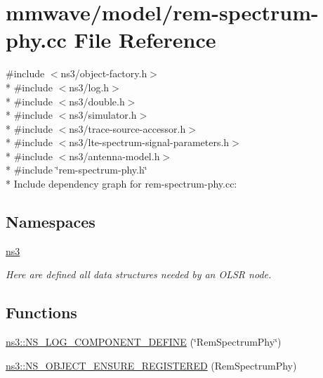 \hypertarget{mmwave_2model_2rem-spectrum-phy_8cc}{}\section{mmwave/model/rem-\/spectrum-\/phy.cc File Reference}
\label{mmwave_2model_2rem-spectrum-phy_8cc}
{\ttfamily \#include $<$ns3/object-\/factory.\+h$>$}\\*
{\ttfamily \#include $<$ns3/log.\+h$>$}\\*
{\ttfamily \#include $<$ns3/double.\+h$>$}\\*
{\ttfamily \#include $<$ns3/simulator.\+h$>$}\\*
{\ttfamily \#include $<$ns3/trace-\/source-\/accessor.\+h$>$}\\*
{\ttfamily \#include $<$ns3/lte-\/spectrum-\/signal-\/parameters.\+h$>$}\\*
{\ttfamily \#include $<$ns3/antenna-\/model.\+h$>$}\\*
{\ttfamily \#include \char`\"{}rem-\/spectrum-\/phy.\+h\char`\"{}}\\*
Include dependency graph for rem-\/spectrum-\/phy.cc\+:
\subsection*{Namespaces}
\begin{DoxyCompactItemize}
\item 
 \hyperlink{namespacens3}{ns3}
\begin{DoxyCompactList}\small\item\em Here are defined all data structures needed by an O\+L\+SR node. \end{DoxyCompactList}\end{DoxyCompactItemize}
\subsection*{Functions}
\begin{DoxyCompactItemize}
\item 
\hyperlink{namespacens3_a25e3dce787023244a4dc9271190670d6}{ns3\+::\+N\+S\+\_\+\+L\+O\+G\+\_\+\+C\+O\+M\+P\+O\+N\+E\+N\+T\+\_\+\+D\+E\+F\+I\+NE} (\char`\"{}Rem\+Spectrum\+Phy\char`\"{})
\item 
\hyperlink{namespacens3_aa31d1958f0cd7cfb906caa74efb86181}{ns3\+::\+N\+S\+\_\+\+O\+B\+J\+E\+C\+T\+\_\+\+E\+N\+S\+U\+R\+E\+\_\+\+R\+E\+G\+I\+S\+T\+E\+R\+ED} (Rem\+Spectrum\+Phy)
\end{DoxyCompactItemize}
